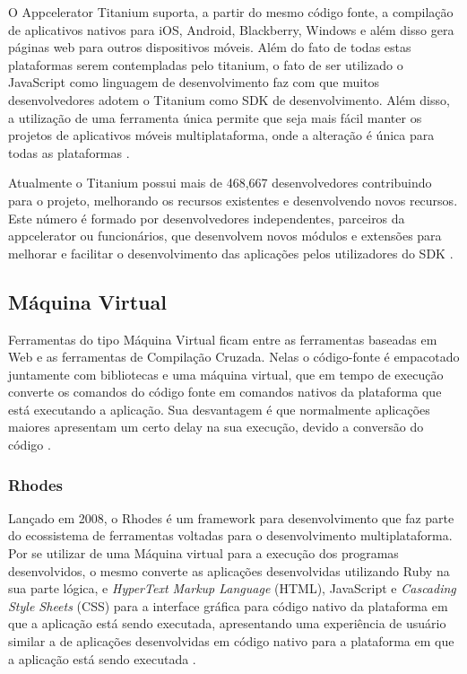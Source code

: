 O Appcelerator Titanium suporta, a partir do mesmo código fonte, a compilação de aplicativos nativos para iOS, Android, Blackberry, Windows e além disso gera páginas web para outros dispositivos móveis. Além do fato de todas estas plataformas serem contempladas pelo titanium, o fato de ser utilizado o JavaScript como linguagem de desenvolvimento faz com que muitos desenvolvedores adotem o Titanium como SDK de desenvolvimento. Além disso, a utilização de uma ferramenta única permite que seja mais fácil manter os projetos de aplicativos móveis multiplataforma, onde a alteração é única para todas as plataformas \cite{appceleratorTitanium}.

Atualmente o Titanium possui mais de 468,667 desenvolvedores contribuindo para o projeto, melhorando os recursos existentes e desenvolvendo novos recursos. Este número é formado por desenvolvedores independentes, parceiros da appcelerator ou funcionários, que desenvolvem novos módulos e extensões para melhorar e facilitar o desenvolvimento das aplicações pelos utilizadores do SDK \cite{appceleratorTitanium}.

\subsection{Máquina Virtual}
Ferramentas do tipo Máquina Virtual ficam entre as ferramentas baseadas em Web e as ferramentas de Compilação Cruzada. Nelas o código-fonte é empacotado juntamente com bibliotecas e uma máquina virtual, que em tempo de execução converte os comandos do código fonte em comandos nativos da plataforma que está executando a aplicação. Sua desvantagem é que normalmente aplicações maiores apresentam um certo delay na sua execução, devido a conversão do código
\cite{CrossPlatformMobileDevelopment2011}.

\subsubsection{Rhodes}
Lançado em 2008, o Rhodes é um framework para desenvolvimento que faz parte do ecossistema de ferramentas voltadas para o desenvolvimento multiplataforma. Por se utilizar de uma Máquina virtual para a execução dos programas desenvolvidos, o mesmo converte as aplicações desenvolvidas utilizando Ruby na sua parte lógica, e \emph{HyperText Markup Language} (HTML), JavaScript e \emph{Cascading Style Sheets} (CSS) para a interface gráfica para código nativo da plataforma em que a aplicação está sendo executada, apresentando uma experiência de usuário similar a de aplicações desenvolvidas em código nativo para a plataforma em que a aplicação está sendo executada
\cite{CrossPlatformMobileDevelopment2011}.

